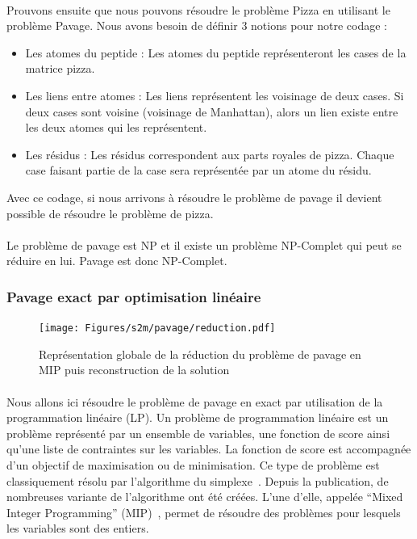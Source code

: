 \documentclass[12pt,french,twoside]{report}
\begin{document}
\paragraph{}Prouvons ensuite que nous pouvons résoudre le problème Pizza en utilisant le problème Pavage.
Nous avons besoin de définir 3 notions pour notre codage :
\begin{itemize}
	\item Les atomes du peptide : Les atomes du peptide représenteront les cases de la matrice pizza.
	\item Les liens entre atomes : Les liens représentent les voisinage de deux cases.
Si deux cases sont voisine (voisinage de Manhattan), alors un lien existe entre les deux atomes qui les représentent.
	\item Les résidus : Les résidus correspondent aux parts royales de pizza.
Chaque case faisant partie de la case sera représentée par un atome du résidu.
\end{itemize}

Avec ce codage, si nous arrivons à résoudre le problème de pavage il devient possible de résoudre le problème de pizza.

\paragraph{}Le problème de pavage est NP et il existe un problème NP-Complet qui peut se réduire en lui.
Pavage est donc NP-Complet.




\subsubsection{Pavage exact par optimisation linéaire}

\label{MIP_p}

\begin{figure}
  \texttt{[image: Figures/s2m/pavage/reduction.pdf]}
  \caption{\label{reduction}Représentation globale de la réduction du problème de pavage en MIP puis reconstruction de la
  solution}
\end{figure}

\paragraph{}Nous allons ici résoudre le problème de pavage en exact par utilisation de la programmation linéaire (LP). Un
problème de programmation linéaire est un
problème représenté par un ensemble de variables, une fonction de score ainsi qu'une liste de contraintes sur les variables. La
fonction de score est accompagnée d'un objectif de maximisation ou de minimisation. Ce type de problème est classiquement résolu
par l'algorithme du simplexe~\cite{murty_linear_1983}. Depuis la publication, de nombreuses variante de l'algorithme ont été
créées. L'une d'elle, appelée ``Mixed Integer Programming'' (MIP)~\cite{wolsey_mixed_2007}, permet de résoudre des problèmes
pour lesquels les variables sont des entiers.
\end{document}
